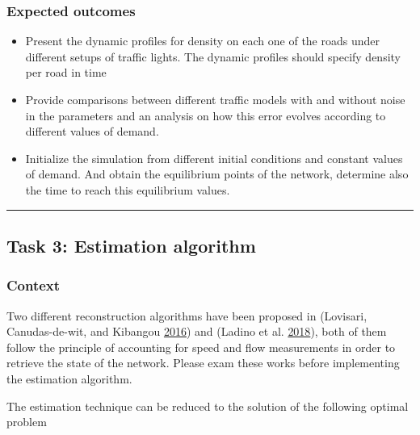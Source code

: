 \documentclass[]{book}
\theoremstyle{definition}
\theoremstyle{definition}
\theoremstyle{definition}
\theoremstyle{remark}
\begin{document}
\hypertarget{expected-outcomes-9}{%
\subsubsection*{Expected outcomes}\label{expected-outcomes-9}}

\begin{itemize}
\item
  Present the dynamic profiles for density on each one of the roads
  under different setups of traffic lights. The dynamic profiles should
  specify density per road in time
\item
  Provide comparisons between different traffic models with and without
  noise in the parameters and an analysis on how this error evolves
  according to different values of demand.
\item
  Initialize the simulation from different initial conditions and
  constant values of demand. And obtain the equilibrium points of the
  network, determine also the time to reach this equilibrium values.
\end{itemize}

\begin{center}\rule{0.5\linewidth}{\linethickness}\end{center}

\hypertarget{task-3-estimation-algorithm}{%
\subsection*{Task 3: Estimation
algorithm}\label{task-3-estimation-algorithm}}

\hypertarget{context-11}{%
\subsubsection*{Context}\label{context-11}}

Two different reconstruction algorithms have been proposed in (Lovisari,
Canudas-de-wit, and Kibangou \protect\hyperlink{ref-Lovisari2016}{2016})
and (Ladino et al. \protect\hyperlink{ref-Ladino2018}{2018}), both of
them follow the principle of accounting for speed and flow measurements
in order to retrieve the state of the network. Please exam these works
before implementing the estimation algorithm.

The estimation technique can be reduced to the solution of the following
optimal problem
\end{document}
